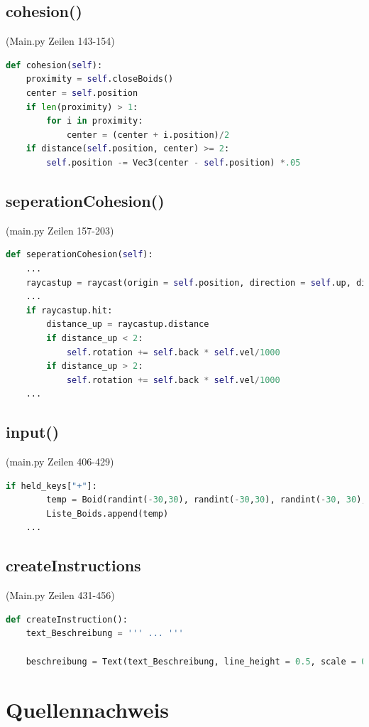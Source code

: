 \documentclass[a4paper, hidelinks, 12pt]{article}
\begin{document}
\subsection{cohesion()}(Main.py Zeilen 143-154)\label{Codecohesion}
\begin{lstlisting}[style=mystyle, language=Python]
def cohesion(self):
	proximity = self.closeBoids()
	center = self.position
	if len(proximity) > 1:
		for i in proximity:
			center = (center + i.position)/2
	if distance(self.position, center) >= 2:
		self.position -= Vec3(center - self.position) *.05
\end{lstlisting}
\subsection{seperationCohesion()}(main.py Zeilen 157-203)\label{CodeseperationCohesion}
\begin{lstlisting}[style=mystyle, language=Python]
def seperationCohesion(self):
	...
	raycastup = raycast(origin = self.position, direction = self.up, distance = 5, traverse_target = scene, ignore = (Wireframe,))
	...
	if raycastup.hit:
		distance_up = raycastup.distance
		if distance_up < 2:
			self.rotation += self.back * self.vel/1000
		if distance_up > 2:
			self.rotation += self.back * self.vel/1000
	...
\end{lstlisting}
\newpage
\subsection{input()}(main.py Zeilen 406-429)\label{Codeinput}
\begin{lstlisting}[style=mystyle, language=Python]
	if held_keys["+"]:
		temp = Boid(randint(-30,30), randint(-30,30), randint(-30, 30), randint(0,360), randint(0,360), randint(0,360), uniform(50.0, 300.0), uniform(0.0, 10.0), 300.0, 1, groesse)
		Liste_Boids.append(temp)
	...
\end{lstlisting}
\subsection{createInstructions}(Main.py Zeilen 431-456)\label{CodeCreateInstructions}
\begin{lstlisting}[style=mystyle, language=Python]
def createInstruction():
	text_Beschreibung = ''' ... '''

	beschreibung = Text(text_Beschreibung, line_height = 0.5, scale = 0.7, x = -.8, y = -.12, color = color.white)
\end{lstlisting}
\newpage

\section{Quellennachweis}
\scriptsize
\newpage
\end{document}
